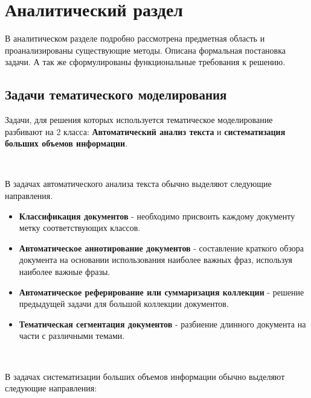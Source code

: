 \chapter{Аналитический раздел}

В аналитическом разделе подробно рассмотрена предметная область и проанализированы существующие методы. Описана формальная постановка задачи. А так же сформулированы функциональные требования к решению.

%
\section{Задачи тематического моделирования}

Задачи, для решения которых используется тематическое моделирование разбивают на 2 класса: \textbf{Автоматический анализ текста} и \textbf{систематизация больших объемов информации}.

~\

В задачах автоматического анализа текста обычно выделяют следующие направления.

\begin{itemize}
    \item \textbf{Классификация документов} - необходимо присвоить каждому документу метку соответствующих классов.
    \item \textbf{Автоматическое аннотирование документов} - составление краткого обзора документа на основании использования наиболее важных фраз, используя наиболее важные фразы.
    \item \textbf{Автоматическое реферирование или суммаризация коллекции} - решение предыдущей задачи для большой коллекции документов.
    \item \textbf{Тематическая сегментация документов} - разбиение длинного документа на части с различными темами.
\end{itemize}

~\

В задачах систематизации больших объемов информации обычно выделяют следующие направления:

